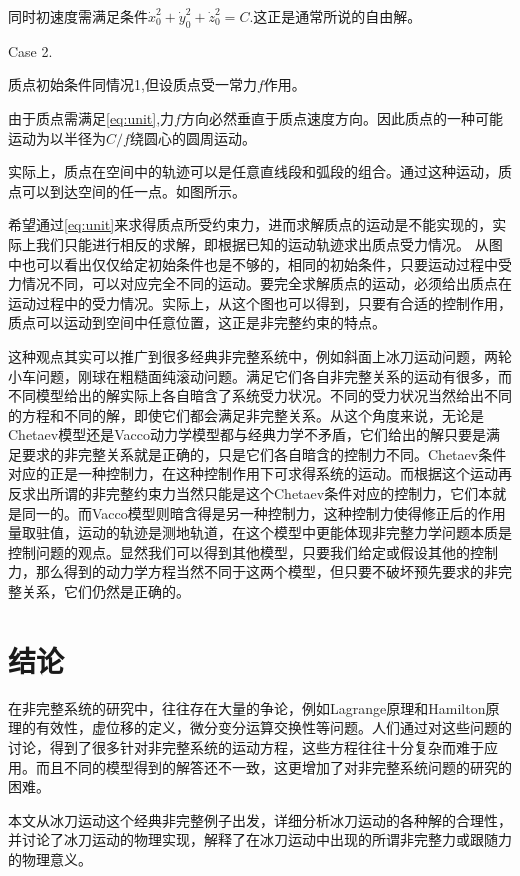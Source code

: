 \documentclass{ctexart}
\begin{document}
同时初速度需满足条件$\dot{x}_0^2+\dot{y}_0^2+\dot{z}_0^2 = C$.这正是通常所说的自由解。

Case 2.

质点初始条件同情况1,但设质点受一常力$f$作用。

由于质点需满足\eqref{eq:unit},力$f$方向必然垂直于质点速度方向。因此质点的一种可能运动为以半径为$C/f$绕圆心的圆周运动。


实际上，质点在空间中的轨迹可以是任意直线段和弧段的组合。通过这种运动，质点可以到达空间的任一点。如图所示。

希望通过\eqref{eq:unit}来求得质点所受约束力，进而求解质点的运动是不能实现的，实际上我们只能进行相反的求解，即根据已知的运动轨迹求出质点受力情况。
从图中也可以看出仅仅给定初始条件也是不够的，相同的初始条件，只要运动过程中受力情况不同，可以对应完全不同的运动。要完全求解质点的运动，必须给出质点在运动过程中的受力情况。实际上，从这个图也可以得到，只要有合适的控制作用，质点可以运动到空间中任意位置，这正是非完整约束的特点。


这种观点其实可以推广到很多经典非完整系统中，例如斜面上冰刀运动问题，两轮小车问题，刚球在粗糙面纯滚动问题。满足它们各自非完整关系的运动有很多，而不同模型给出的解实际上各自暗含了系统受力状况。不同的受力状况当然给出不同的方程和不同的解，即使它们都会满足非完整关系。从这个角度来说，无论是Chetaev模型还是Vacco动力学模型都与经典力学不矛盾，它们给出的解只要是满足要求的非完整关系就是正确的，只是它们各自暗含的控制力不同。Chetaev条件对应的正是一种控制力，在这种控制作用下可求得系统的运动。而根据这个运动再反求出所谓的非完整约束力当然只能是这个Chetaev条件对应的控制力，它们本就是同一的。而Vacco模型则暗含得是另一种控制力，这种控制力使得修正后的作用量取驻值，运动的轨迹是测地轨道，在这个模型中更能体现非完整力学问题本质是控制问题的观点。显然我们可以得到其他模型，只要我们给定或假设其他的控制力，那么得到的动力学方程当然不同于这两个模型，但只要不破坏预先要求的非完整关系，它们仍然是正确的。


\section{结论}
\label{sec:conclusion}

在非完整系统的研究中，往往存在大量的争论，例如Lagrange原理和Hamilton原理的有效性，虚位移的定义，微分变分运算交换性等问题。人们通过对这些问题的讨论，得到了很多针对非完整系统的运动方程，这些方程往往十分复杂而难于应用。而且不同的模型得到的解答还不一致，这更增加了对非完整系统问题的研究的困难。

本文从冰刀运动这个经典非完整例子出发，详细分析冰刀运动的各种解的合理性，并讨论了冰刀运动的物理实现，解释了在冰刀运动中出现的所谓非完整力或跟随力的物理意义。
\end{document}
